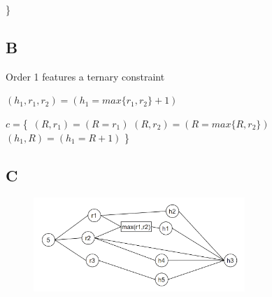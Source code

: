 \documentclass{article}
\begin{document}
\}\

\subsection{B}
Order 1 features a ternary constraint 

$(h_1, r_1, r_2) = (h_1 = max\{r_1, r_2\} + 1)$ \newline

$c = $\{\
$(R, r_1) = (R = r_1)$ \newline
$(R, r_2) = (R = max\{R, r_2\})$ \newline
$(h_1, R) = (h_1 = R+1)$ \newline
\}\

\subsection{C}

\begin{figure}[ht]
\includegraphics[width=8cm]{ConstraintGraph.png}
\centering
\end{figure}
\end{document}
